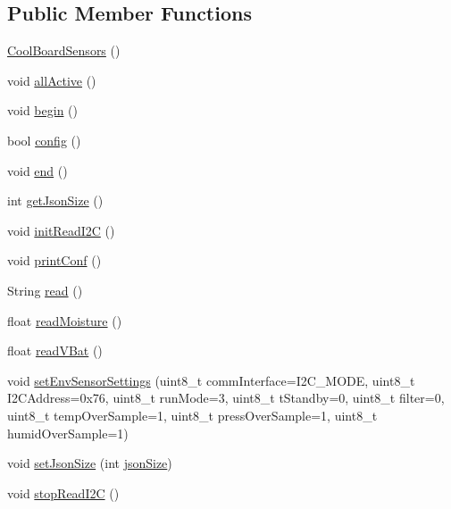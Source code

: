 \subsection*{Public Member Functions}
\begin{DoxyCompactItemize}
\item 
\hyperlink{classCoolBoardSensors_a91ff2a02f5486f90cf2413a1cf8a9ed4}{Cool\+Board\+Sensors} ()
\item 
void \hyperlink{classCoolBoardSensors_aa432c5aac88f89c31a10766390f23e0b}{all\+Active} ()
\item 
void \hyperlink{classCoolBoardSensors_a97095823ef7c8f5290812f1405b966b3}{begin} ()
\item 
bool \hyperlink{classCoolBoardSensors_a9a218895c5423375c33c08f2c56fb23a}{config} ()
\item 
void \hyperlink{classCoolBoardSensors_a4902b69f6e628bd6557193758fdd2bae}{end} ()
\item 
int \hyperlink{classCoolBoardSensors_ab82c2a1633768ccd12a589320fa31a14}{get\+Json\+Size} ()
\item 
void \hyperlink{classCoolBoardSensors_acad6a8418c66d36868caca23c844ecb6}{init\+Read\+I2C} ()
\item 
void \hyperlink{classCoolBoardSensors_af6fd79505815b204c178617ecf54c873}{print\+Conf} ()
\item 
String \hyperlink{classCoolBoardSensors_a91badb2539d91fda8679f2a597874c48}{read} ()
\item 
float \hyperlink{classCoolBoardSensors_a8761bff50373c485f4465c8db47d0633}{read\+Moisture} ()
\item 
float \hyperlink{classCoolBoardSensors_a6944b6ea7bce8e2fce1b434acfd9d5f3}{read\+V\+Bat} ()
\item 
void \hyperlink{classCoolBoardSensors_a406307ffd70272282d91479c7ed8d66f}{set\+Env\+Sensor\+Settings} (uint8\+\_\+t comm\+Interface=I2\+C\+\_\+\+M\+O\+DE, uint8\+\_\+t I2\+C\+Address=0x76, uint8\+\_\+t run\+Mode=3, uint8\+\_\+t t\+Standby=0, uint8\+\_\+t filter=0, uint8\+\_\+t temp\+Over\+Sample=1, uint8\+\_\+t press\+Over\+Sample=1, uint8\+\_\+t humid\+Over\+Sample=1)
\item 
void \hyperlink{classCoolBoardSensors_ab76e6dbd6efbcc25ff460535badd8d45}{set\+Json\+Size} (int \hyperlink{classCoolBoardSensors_a05a40dc80bfff14ffb830f549b876f8d}{json\+Size})
\item 
void \hyperlink{classCoolBoardSensors_ab67b900b9e5e7c18d52d2d9107ba171b}{stop\+Read\+I2C} ()
\end{DoxyCompactItemize}
